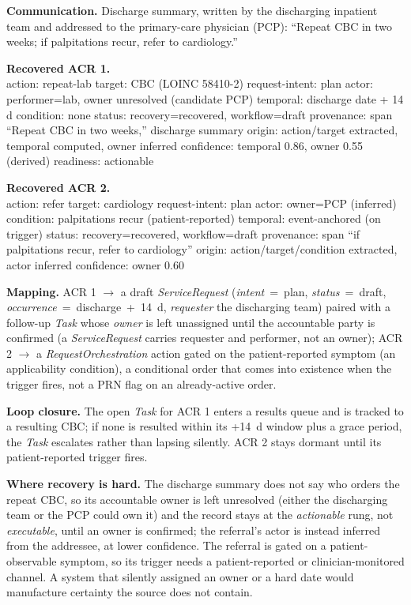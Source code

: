 \textbf{Communication.} Discharge summary, written by the discharging inpatient team and addressed to the primary-care physician (PCP): ``Repeat CBC in two weeks; if palpitations recur, refer to cardiology.''

\textbf{Recovered ACR 1.}\\
{action: repeat-lab} {target: CBC (LOINC 58410-2)} {request-intent: plan} {actor: performer=lab, owner unresolved (candidate PCP)} {temporal: discharge date + 14 d} {condition: none} {status: recovery=recovered, workflow=draft} {provenance: span ``Repeat CBC in two weeks,'' discharge summary} {origin: action/target extracted, temporal computed, owner inferred} {confidence: temporal 0.86, owner 0.55} {(derived) readiness: actionable}

\textbf{Recovered ACR 2.}\\
{action: refer} {target: cardiology} {request-intent: plan} {actor: owner=PCP (inferred)} {condition: palpitations recur (patient-reported)} {temporal: event-anchored (on trigger)} {status: recovery=recovered, workflow=draft} {provenance: span ``if palpitations recur, refer to cardiology''} {origin: action/target/condition extracted, actor inferred} {confidence: owner 0.60}

\textbf{Mapping.} ACR 1 $\rightarrow$ a draft \emph{ServiceRequest} (\emph{intent}~=~plan, \emph{status}~=~draft, \emph{occurrence}~=~discharge~+~14~d, \emph{requester} the discharging team) paired with a follow-up \emph{Task} whose \emph{owner} is left unassigned until the accountable party is confirmed (a \emph{ServiceRequest} carries requester and performer, not an owner); ACR 2 $\rightarrow$ a \emph{RequestOrchestration} action gated on the patient-reported symptom (an applicability condition), a conditional order that comes into existence when the trigger fires, not a PRN flag on an already-active order.

\textbf{Loop closure.} The open \emph{Task} for ACR 1 enters a results queue and is tracked to a resulting CBC; if none is resulted within its +14~d window plus a grace period, the \emph{Task} escalates rather than lapsing silently. ACR 2 stays dormant until its patient-reported trigger fires.

\textbf{Where recovery is hard.} The discharge summary does not say who orders the repeat CBC, so its accountable owner is left unresolved (either the discharging team or the PCP could own it) and the record stays at the \emph{actionable} rung, not \emph{executable}, until an owner is confirmed; the referral's actor is instead inferred from the addressee, at lower confidence. The referral is gated on a patient-observable symptom, so its trigger needs a patient-reported or clinician-monitored channel. A system that silently assigned an owner or a hard date would manufacture certainty the source does not contain.

